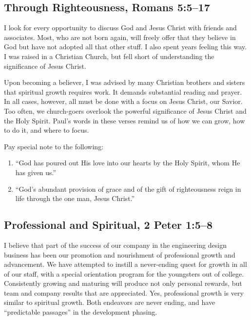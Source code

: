 \documentclass[12pt]{memoir}
\begin{document}
\subsection[Through Righteousness]{Through Righteousness, Romans 5:5--17}

I look for every opportunity to discuss God and Jesus Christ with friends and associates.
Most, who are not born again, will freely offer that they believe in God but have not adopted all that other stuff. I also spent years feeling this way. I was raised in a Christian Church, but fell short of understanding the significance of Jesus Christ.

Upon becoming a believer, I was advised by many Christian brothers
and sisters that spiritual growth requires work. It demands substantial
reading and prayer. In all cases, however, all must be done with a
focus on Jesus Christ, our Savior. Too often, we church-goers overlook
the powerful significance of Jesus Christ and the Holy Spirit.
Paul's
words in these verses remind us of how we can grow, how to do it, and where to focus. 

Pay special note to the following: 

\begin{enumerate}
\item ``God has poured out His love into our hearts by the Holy Spirit, whom He has given us.'' 
\item ``God's abundant provision of grace and of the gift of righteousness reign in life through the one man, Jesus Christ.'' 
\end{enumerate}

\subsection[Professional and Spiritual]{Professional and Spiritual, 2 Peter 1:5--8}

I believe that part of the success of our company in the engineering
design business has been our promotion and nourishment of professional
growth and advancement. We have attempted to instill a never-ending
quest for growth in all of our staff, with a special orientation program
for the youngsters out of college. Consistently growing and maturing
will produce not only personal rewards, but team and company results
that are appreciated. Yes, professional growth is very similar to
spiritual growth. Both endeavors are never ending, and have ``predictable
passages'' in the development phasing. 
\end{document}
